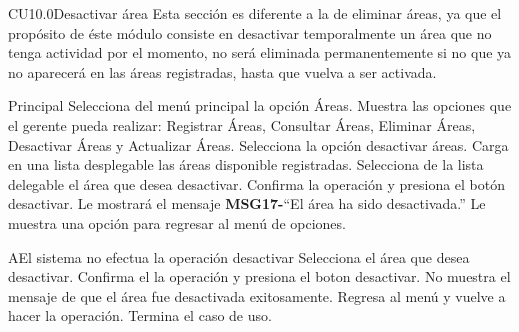 

	\begin{UseCase}{CU10.0}{Desactivar área}{
		Esta sección es diferente a la de eliminar áreas, ya que el propósito de éste módulo consiste en desactivar temporalmente un área que no tenga actividad por el momento, no será eliminada permanentemente si no que ya no aparecerá en las áreas registradas, hasta que vuelva a ser activada.
	}
	\end{UseCase}

\begin{UCtrayectoria}{Principal}
		\UCpaso[\UCactor] Selecciona del menú principal la opción Áreas.
		\UCpaso Muestra las opciones que el gerente pueda realizar: Registrar Áreas, Consultar Áreas, Eliminar Áreas, Desactivar Áreas y Actualizar Áreas.
		\UCpaso[\UCactor] Selecciona la opción desactivar áreas.
		\UCpaso Carga en una lista desplegable las áreas disponible registradas.
		\UCpaso[\UCactor] Selecciona de la lista delegable el área que desea desactivar.
		\UCpaso[\UCactor] Confirma la operación y presiona el botón desactivar.
		\UCpaso Le mostrará el mensaje {\bf MSG17-}``El área ha sido desactivada.''
		\UCpaso Le muestra una opción para regresar al menú de opciones.
	\end{UCtrayectoria}

\begin{UCtrayectoriaA}{A}{El sistema no efectua la operación desactivar}
			\UCpaso[\UCactor] Selecciona el área que desea desactivar.
			\UCpaso[\UCactor] Confirma el la operación y presiona el boton desactivar.
			\UCpaso No muestra el mensaje de que el área fue desactivada exitosamente.
			\UCpaso[\UCactor] Regresa al menú y vuelve a hacer la operación.
			\UCpaso[] Termina el caso de uso.
\end{UCtrayectoriaA}
